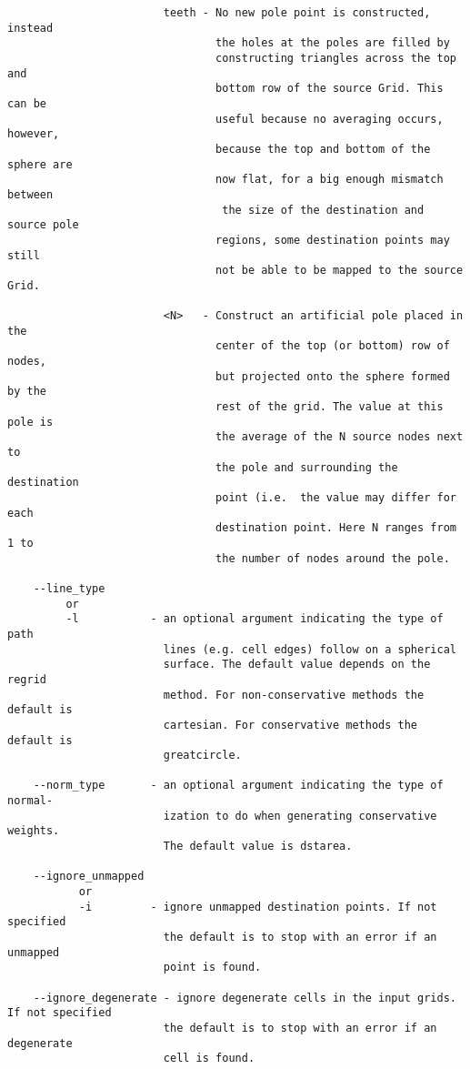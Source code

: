 \begin{verbatim}
                        teeth - No new pole point is constructed, instead
                                the holes at the poles are filled by
                                constructing triangles across the top and
                                bottom row of the source Grid. This can be
                                useful because no averaging occurs, however,
                                because the top and bottom of the sphere are
                                now flat, for a big enough mismatch between
                                 the size of the destination and source pole
                                regions, some destination points may still
                                not be able to be mapped to the source Grid.

                        <N>   - Construct an artificial pole placed in the
                                center of the top (or bottom) row of nodes,
                                but projected onto the sphere formed by the
                                rest of the grid. The value at this pole is
                                the average of the N source nodes next to
                                the pole and surrounding the destination
                                point (i.e.  the value may differ for each
                                destination point. Here N ranges from 1 to
                                the number of nodes around the pole.

    --line_type 
         or
         -l           - an optional argument indicating the type of path
                        lines (e.g. cell edges) follow on a spherical
                        surface. The default value depends on the regrid
                        method. For non-conservative methods the default is
                        cartesian. For conservative methods the default is
                        greatcircle. 

    --norm_type       - an optional argument indicating the type of normal-
                        ization to do when generating conservative weights. 
                        The default value is dstarea.

    --ignore_unmapped
           or
           -i         - ignore unmapped destination points. If not specified
                        the default is to stop with an error if an unmapped
                        point is found.

    --ignore_degenerate - ignore degenerate cells in the input grids. If not specified
                        the default is to stop with an error if an degenerate
                        cell is found.


\end{verbatim}
